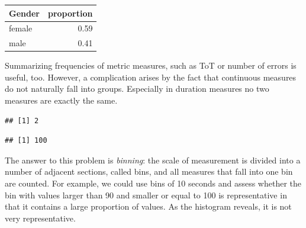 \documentclass[]{svmono}
\newenvironment{Shaded}{\begin{snugshade}}{\end{snugshade}}
\newcommand{\KeywordTok}[1]{\textcolor[rgb]{0.13,0.29,0.53}{\textbf{#1}}}
\newcommand{\OperatorTok}[1]{\textcolor[rgb]{0.81,0.36,0.00}{\textbf{#1}}}
\newcommand{\NormalTok}[1]{#1}
\theoremstyle{definition}
\theoremstyle{definition}
\theoremstyle{definition}
\theoremstyle{remark}
\begin{document}
\begin{tabular}{l|r}
\hline
Gender & proportion\\
\hline
female & 0.59\\
\hline
male & 0.41\\
\hline
\end{tabular}

Summarizing frequencies of metric measures, such as ToT or number of
errors is useful, too. However, a complication arises by the fact that
continuous measures do not naturally fall into groups. Especially in
duration measures no two measures are exactly the same.

\begin{Shaded}
\end{Shaded}

\begin{verbatim}
## [1] 2
\end{verbatim}

\begin{Shaded}
\end{Shaded}

\begin{verbatim}
## [1] 100
\end{verbatim}

The answer to this problem is \emph{binning}: the scale of measurement
is divided into a number of adjacent sections, called bins, and all
measures that fall into one bin are counted. For example, we could use
bins of 10 seconds and assess whether the bin with values larger than 90
and smaller or equal to 100 is representative in that it contains a
large proportion of values. As the histogram reveals, it is not very
representative.
\end{document}
